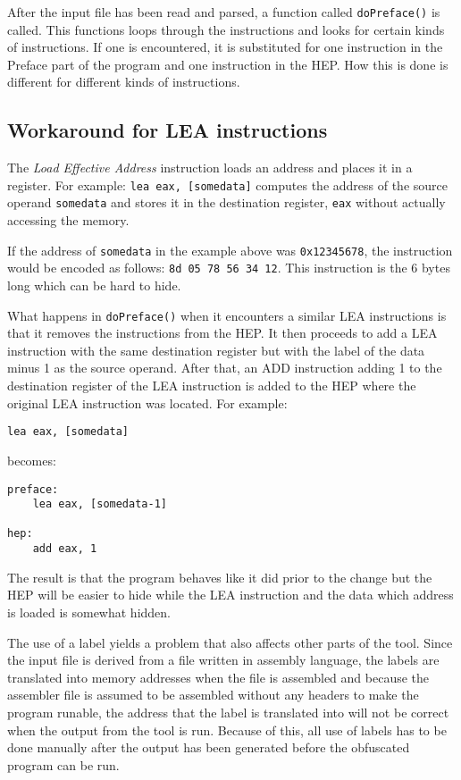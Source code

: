\documentclass[11pt,twoside]{eitExjobb}
\begin{document}
After the input file has been read and parsed, a function called \texttt{doPreface()} is called. This functions loops through the instructions and looks for certain kinds of instructions. If one is encountered, it is substituted for one instruction in the Preface part of the program and one instruction in the HEP. How this is done is different for different kinds of instructions.  

\subsection{Workaround for LEA instructions}
The \emph{Load Effective Address} instruction loads an address and places it in a register. For example: \texttt{lea eax, [somedata]} computes the address of the source operand \texttt{somedata} and stores it in the destination register, \texttt{eax} without actually accessing the memory. 

If the address of \texttt{somedata} in the example above was \texttt{0x12345678}, the instruction would be encoded as follows: \texttt{8d 05 78 56 34 12}. This instruction is the 6 bytes long which can be hard to hide. 

What happens in \texttt{doPreface()} when it encounters a similar LEA instructions is that it removes the instructions from the HEP. It then proceeds to add a LEA instruction with the same destination register but with the label of the data minus 1 as the source operand. After that, an ADD instruction adding 1 to the destination register of the LEA instruction is added to the HEP where the original LEA instruction was located. For example:

\begin{verbatim}
lea eax, [somedata]
\end{verbatim}

\noindent becomes:

\begin{verbatim}
preface:
	lea eax, [somedata-1]

hep:
	add eax, 1
\end{verbatim}

\noindent The result is that the program behaves like it did prior to the change but the HEP will be easier to hide while the LEA instruction and the data which address is loaded is somewhat hidden.

The use of a label yields a problem that also affects other parts of the tool. Since the input file is derived from a file written in assembly language, the labels are translated into memory addresses when the file is assembled and because the assembler file is assumed to be assembled without any headers to make the program runable, the address that the label is translated into will not be correct when the output from the tool is run. Because of this, all use of labels has to be done manually after the output has been generated before the obfuscated program can be run.
\end{document}
